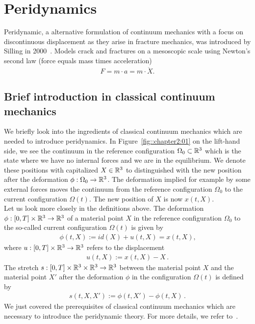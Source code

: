 \chapter{Peridynamics}
\label{sec:pd}
Peridynamic, a alternative formulation of continuum mechanics with a focus on discontinuous displacement as they arise in fracture mechanics, was introduced by Silling in 2000~\cite{silling2000reformulation,silling2005meshfree}. Models crack and fractures on a mesoscopic scale using Newton's second law (force equals mass times acceleration)
\begin{align}
F = m \cdot a = m \cdot \ddot X \text{.}
\end{align}



\section{Brief introduction in classical continuum mechanics}
We briefly look into the ingredients of classical continuum mechanics which are needed to introduce peridynamics. In Figure~\ref{fig::chapter2:01} on the lift-hand side, we see the continuum in the reference configuration $\Omega_0 \subset \mathbb{R}^3$ which is the state where we have no internal forces and we are in the equilibrium. We denote these positions with capitalized $X \in \mathbb{R}^3$ to distinguished with the new position after the deformation $\phi : \Omega_0 \rightarrow \mathbb{R}^3$. The deformation implied for example by some external forces moves the continuum from the reference configuration  $\Omega_0$ to the current configuration $\Omega(t)$. The new position of $X$ is now $x(t,X)$.\\

Let us look more closely in the definitions above. The deformation $\phi:[0,T]\times\mathbb{R}^3\rightarrow\mathbb{R}^3$ of a material point $X$ in the reference configuration $\Omega_0$ to the so-called current configuration $\Omega(t)$ is given by
\begin{align*}
\phi(t,X) := id(X) + u(t,X) = x(t,X) \text{,}
\end{align*}
where $u:[0,T]\times\mathbb{R}^3\rightarrow\mathbb{R}^3$ refers to the displacement
\begin{align*}
u(t,X):= x(t,X) - X\,\text{.}
\end{align*}
The stretch $s:[0,T]\times\mathbb{R}^3\times\mathbb{R}^3\rightarrow\mathbb{R}^3$ between the material point $X$ and the material point $X'$ after the deformation $\phi$ in the configuration $\Omega(t)$ is defined by
\begin{align*}
s(t,X,X') := \phi(t,X') - \phi(t,X) \,\text{.}
\end{align*}
We just covered the prerequisites of classical continuum mechanics which are necessary to introduce the peridynamic theory. For more details, we refer to~\cite{gurtin1982introduction,liu2013continuum}.

